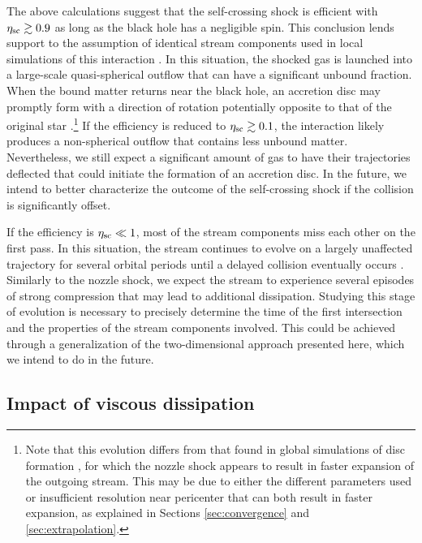 \documentclass[a4paper,fleqn,usenatbib]{mnras}
\begin{document}
The above calculations suggest that the self-crossing shock is efficient with $\eta_{\rm sc} \gtrsim 0.9$ as long as the black hole has a negligible spin. This conclusion lends support to the assumption of identical stream components used in local simulations of this interaction \citep{lee1996,kim1999,jiang2016,lu2020}. In this situation, the shocked gas is launched into a large-scale quasi-spherical outflow that can have a significant unbound fraction. When the bound matter returns near the black hole, an accretion disc may promptly form with a direction of rotation potentially opposite to that of the original star \citep{bonnerot2020-realistic,bonnerot2021-light}.\footnote{Note that this evolution differs from that found in global simulations of disc formation \citep[e.g.][]{shiokawa2015,sadowski2016}, for which the nozzle shock appears to result in faster expansion of the outgoing stream. This may be due to either the different parameters used or insufficient resolution near pericenter that can both result in faster expansion, as explained in Sections \ref{sec:convergence} and \ref{sec:extrapolation}.} If the efficiency is reduced to $\eta_{\rm sc} \gtrsim 0.1$, the interaction likely produces a non-spherical outflow that contains less unbound matter. Nevertheless, we still expect a significant amount of gas to have their trajectories deflected that could initiate the formation of an accretion disc. In the future, we intend to better characterize the outcome of the self-crossing shock if the collision is significantly offset.


If the efficiency is $\eta_{\rm sc} \ll 1$, most of the stream components miss each other on the first pass. In this situation, the stream continues to evolve on a largely unaffected trajectory for several orbital periods until a delayed collision eventually occurs \citep{guillochon2015}. Similarly to the nozzle shock, we expect the stream to experience several episodes of strong compression that may lead to additional dissipation. Studying this stage of evolution is necessary to precisely determine the time of the first intersection and the properties of the stream components involved. This could be achieved through a generalization of the two-dimensional approach presented here, which we intend to do in the future.


\subsection{Impact of viscous dissipation}
\end{document}
